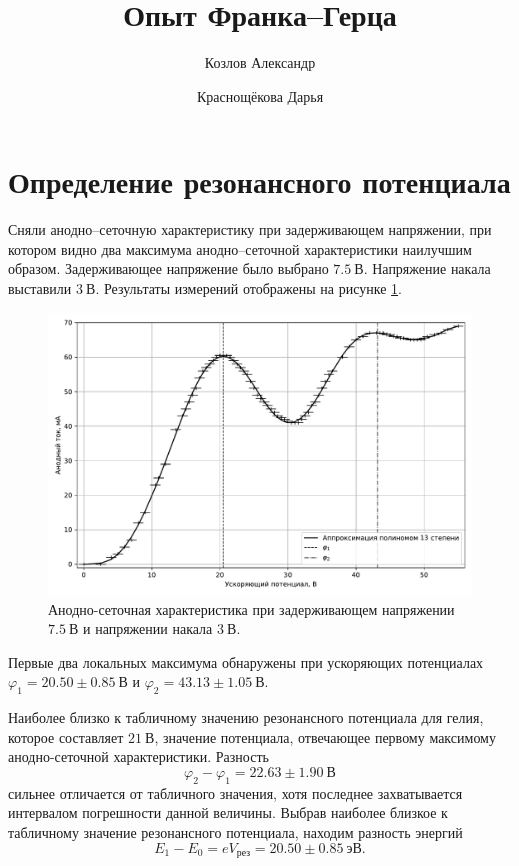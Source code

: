 \documentclass[12pt]{article}
\title{Опыт Франка\---Герца}
\author{Козлов Александр \and Краснощёкова Дарья}
\begin{document}
	

	\tableofcontents
	\newpage
	\section{Определение резонансного потенциала}
	Сняли анодно\---сеточную характеристику при задерживающем напряжении, при котором видно два максимума анодно\---сеточной характеристики наилучшим образом. Задерживающее напряжение было выбрано $7.5\ \text{В}$. Напряжение накала выставили $3\ \text{В}$. Результаты измерений отображены на рисунке \ref{fig:figure1}.
	\begin{figure}[htbp]
		\centering
		\includegraphics[width=\linewidth]{../plots/1}
		\caption{Анодно-сеточная характеристика при задерживающем напряжении $7.5\ \text{В}$ и напряжении накала $3\ \text{В}$.}
		\label{fig:figure1}
	\end{figure}
	Первые два локальных максимума обнаружены при ускоряющих потенциалах $\varphi_1 = 20.50\pm0.85\ \text{В}$ и $\varphi_2 = 43.13\pm1.05\ \text{В}$.
	\par Наиболее близко к табличному значению резонансного потенциала для гелия, которое составляет $21\ \text{В}$, значение потенциала, отвечающее первому максимому анодно-сеточной характеристики. Разность 
	\begin{equation}
		\varphi_2 - \varphi_1 = 22.63\pm1.90\ \text{В}
	\end{equation}
	сильнее отличается от табличного значения, хотя последнее захватывается интервалом погрешности данной величины. Выбрав наиболее близкое к табличному значение резонансного потенциала, находим разность энергий
	\begin{equation}
			E_1 - E_0 = eV_\text{рез} = 20.50\pm0.85\ \text{эВ}.
	\end{equation}
\end{document}
